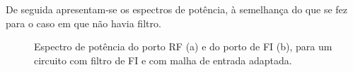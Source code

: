\documentclass[11pt]{article}
\numberwithin{equation}{section}
\begin{document}
De seguida apresentam-se os espectros de potência, à semelhança do que se fez para o caso em que não havia filtro.

\begin{figure}[h]
	\centering
	\hspace{8mm}
	\vspace{-0.8em}
	\caption{Espectro de potência do porto RF (a) e do porto de FI (b), para um circuito com filtro de FI e com malha de entrada adaptada.}
	\vspace{-0.8em}
\end{figure}
\end{document}
